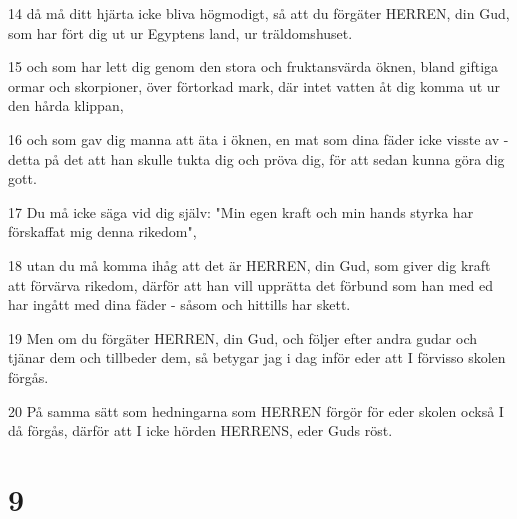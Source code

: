 \par 14 då må ditt hjärta icke bliva högmodigt, så att du förgäter HERREN, din Gud, som har fört dig ut ur Egyptens land, ur träldomshuset.
\par 15 och som har lett dig genom den stora och fruktansvärda öknen, bland giftiga ormar och skorpioner, över förtorkad mark, där intet vatten åt dig komma ut ur den hårda klippan,
\par 16 och som gav dig manna att äta i öknen, en mat som dina fäder icke visste av - detta på det att han skulle tukta dig och pröva dig, för att sedan kunna göra dig gott.
\par 17 Du må icke säga vid dig själv: "Min egen kraft och min hands styrka har förskaffat mig denna rikedom",
\par 18 utan du må komma ihåg att det är HERREN, din Gud, som giver dig kraft att förvärva rikedom, därför att han vill upprätta det förbund som han med ed har ingått med dina fäder - såsom och hittills har skett.
\par 19 Men om du förgäter HERREN, din Gud, och följer efter andra gudar och tjänar dem och tillbeder dem, så betygar jag i dag inför eder att I förvisso skolen förgås.
\par 20 På samma sätt som hedningarna som HERREN förgör för eder skolen också I då förgås, därför att I icke hörden HERRENS, eder Guds röst.

\chapter{9}

